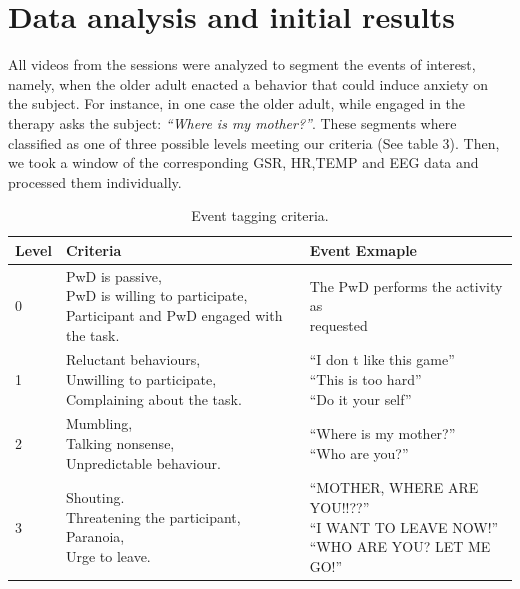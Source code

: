 \section{Data analysis and initial results}
All videos from the sessions were analyzed to segment
the events of interest, namely, when the older adult
enacted a behavior that could induce anxiety on the subject.
For instance, in one case the older adult, while engaged in
the therapy asks the subject: \textit{``Where is my mother?''}.
These segments where classified as one of three possible 
levels meeting our criteria (See table 3). Then, we took
a window of the corresponding GSR, HR,TEMP and EEG data 
and processed them individually.
\begin{table}[h]
  \caption{Event tagging criteria.}
    \begin{tabular}{|l|l|l|}
    \hline
    \textbf{Level} & \textbf{Criteria}                                                                                    & \textbf{Event Exmaple}                                                                      \\ \hline
    0     & \pbox{7cm}{PwD is passive,\\PwD is willing to participate,  \\Participant and PwD engaged with the task.} &                   \pbox{7cm}{The PwD performs the activity as \\requested}                       \\ \hline
    1     & \pbox{7cm}{Reluctant behaviours,\\Unwilling to participate,  \\Complaining about the task.}                & \pbox{7cm}{ ``I don t like this game'' \\ ``This is too hard'' \\``Do it your self'' }             \\ \hline
    2     & \pbox{5cm}{Mumbling,\\Talking nonsense,  \\Unpredictable behaviour.}                                      & \pbox{5cm}{``Where is my mother?''\\``Who are you?''}                                          \\ \hline
    3     & \pbox{5cm}{Shouting.\\Threatening the participant,\\Paranoia,  \\Urge to leave.}                          & \pbox{5cm}{``MOTHER, WHERE ARE YOU!!??''\\``I WANT TO LEAVE NOW!''  \\``WHO ARE YOU? LET ME GO!'' } \\ \hline
    \end{tabular}
\end{table}
